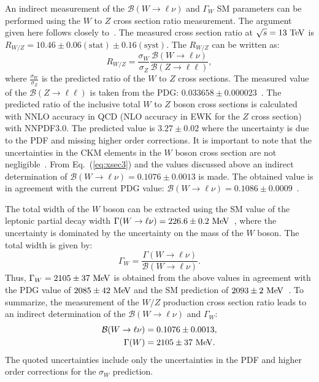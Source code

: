 An indirect measurement of the $\mathcal{B}(W \rightarrow \ell \nu)$  and $\Gamma_W$ SM parameters can be performed using the $W$ to $Z$ cross section ratio measurement. The argument given here follows closely to~\cite{CMS:2011aa}. The measured cross section ratio at $\sqrt{s}=13~\mathrm{Te\kern -0.1em V}$ is $R_{W/Z}=10.46 \pm 0.06 (\mathrm{stat}) \pm 0.16(\mathrm{syst})$. The $R_{W/Z}$ can be written as:
\begin{equation} \label{eq:xsec3}
R_{W/Z} = \frac{\sigma_W}{\sigma_Z} \frac{\mathcal{B}(W\rightarrow \ell\nu)}{\mathcal{B}(Z\rightarrow \ell\ell)},
\end{equation}
where $\frac{\sigma_W}{\sigma_Z}$ is the predicted ratio of the $W$ to $Z$ cross sections. The measured value of the  $\mathcal{B}(Z\rightarrow \ell\ell)$ is taken from the PDG: $0.033658 \pm 0.000023$~\cite{Agashe:2014kda}. The predicted ratio of the inclusive total $W$ to $Z$ boson cross sections is calculated with NNLO accuracy in QCD (NLO accuracy in EWK for the $Z$ cross section) with NNPDF3.0. The predicted value is $3.27\pm0.02$ where the uncertainty is due to the PDF and missing higher order corrections. It is important to note that the uncertainties in the CKM elements in the $W$ boson cross section are not negligible~\cite{Renton:2008ub}. From Eq.~(\ref{eq:xsec3}) and the values discussed above an indirect determination of  $\mathcal{B}(W \rightarrow \ell \nu) = 0.1076 \pm 0.0013$ is made. The obtained value is in agreement with the current PDG value: $\mathcal{B}(W \rightarrow \ell \nu) = 0.1086 \pm 0.0009$~\cite{Agashe:2014kda}. 

The total width of the $W$ boson can be extracted using the SM value of the leptonic partial decay width $\Gamma(W \rightarrow \ell \nu)=226.6 \pm 0.2~\mathrm{Me\kern -0.1em V}$~\cite{Rosner:1993rj,Renton:2008ub}, where the uncertainty is dominated by the uncertainty on the mass of the $W$ boson. The total width is given by:
\begin{equation} \label{eq:xsec4}
\Gamma_W = \frac{\Gamma(W \rightarrow \ell \nu)}{\mathcal{B}(W \rightarrow \ell \nu) }.
\end{equation}
Thus, $\Gamma_W = 2105 \pm 37~\mathrm{Me\kern -0.1em V}$ is obtained from the above values in agreement with the PDG value of $2085 \pm 42~\mathrm{Me\kern -0.1em V}$ and the SM prediction of $2093 \pm 2~\mathrm{Me\kern -0.1em V}$~\cite{Renton:2008ub}. To summarize, the measurement of the $W/Z$ production cross section ratio leads to an indirect determination of the $\mathcal{B}(W\rightarrow \ell\nu)$  and $\Gamma_W$:
\begin{eqnarray} \label{eq:xsecm}
\begin{aligned}
\mathcal{B}(W\rightarrow \ell\nu) &= 0.1076 \pm 0.0013, \\
\Gamma(W) &= 2105 \pm 37~\mathrm{Me\kern -0.1em V}.
\end{aligned}
\end{eqnarray}
The quoted uncertainties include only the uncertainties in the PDF and higher order corrections for the $\sigma_W$ prediction. 
 
